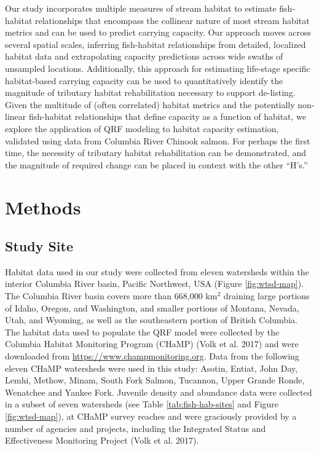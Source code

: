 \documentclass[
  12pt,
]{article}
\begin{document}
Our study incorporates multiple measures of stream habitat to estimate fish-habitat relationships that encompass the collinear nature of most stream habitat metrics and can be used to predict carrying capacity. Our approach moves across several spatial scales, inferring fish-habitat relationships from detailed, localized habitat data and extrapolating capacity predictions across wide swaths of unsampled locations. Additionally, this approach for estimating life-stage specific habitat-based carrying capacity can be used to quantitatively identify the magnitude of tributary habitat rehabilitation necessary to support de-listing. Given the multitude of (often correlated) habitat metrics and the potentially non-linear fish-habitat relationships that define capacity as a function of habitat, we explore the application of QRF modeling to habitat capacity estimation, validated using data from Columbia River Chinook salmon. For perhaps the first time, the necessity of tributary habitat rehabilitation can be demonstrated, and the magnitude of required change can be placed in context with the other ``H's.''

\hypertarget{methods}{%
\section{Methods}\label{methods}}

\hypertarget{study-site}{%
\subsection{Study Site}\label{study-site}}

Habitat data used in our study were collected from eleven watersheds within the interior Columbia River basin, Pacific Northwest, USA (Figure \ref{fig:wtsd-map}). The Columbia River basin covers more than 668,000 km\(^2\) draining large portions of Idaho, Oregon, and Washington, and smaller portions of Montana, Nevada, Utah, and Wyoming, as well as the southeastern portion of British Columbia. The habitat data used to populate the QRF model were collected by the Columbia Habitat Monitoring Program (CHaMP) (Volk et al. 2017) and were downloaded from \url{https://www.champmonitoring.org}. Data from the following eleven CHaMP watersheds were used in this study: Asotin, Entiat, John Day, Lemhi, Methow, Minam, South Fork Salmon, Tucannon, Upper Grande Ronde, Wenatchee and Yankee Fork. Juvenile density and abundance data were collected in a subset of seven watersheds (see Table \ref{tab:fish-hab-sites} and Figure \ref{fig:wtsd-map}), at CHaMP survey reaches and were graciously provided by a number of agencies and projects, including the Integrated Status and Effectiveness Monitoring Project (Volk et al. 2017).
\end{document}
